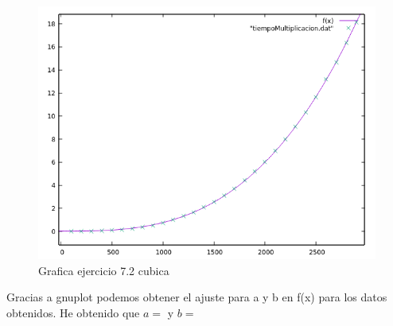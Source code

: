 \documentclass[12pt,a4psprt]{article}
\begin{document}
\begin{figure}[h]
\begin{center}
	\includegraphics[scale=1]{image/grafica_7_2_cubica.png}
\end{center}
\caption{Grafica ejercicio 7.2 cubica}

\end{figure}
Gracias a gnuplot podemos obtener el ajuste para a y b en f(x) para los datos obtenidos.
He obtenido que $a=$ y $b=$
\end{document}
